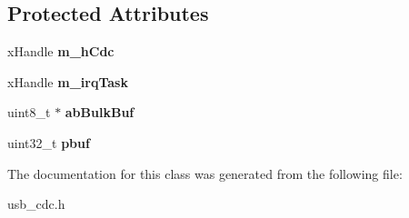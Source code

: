 \subsection*{Protected Attributes}
\begin{DoxyCompactItemize}
\item 
\hypertarget{classusb_c_d_c_a3e75d771150245f193312bd7bc8e6c6c}{x\-Handle {\bfseries m\-\_\-h\-Cdc}}\label{classusb_c_d_c_a3e75d771150245f193312bd7bc8e6c6c}

\item 
\hypertarget{classusb_c_d_c_a9dd6cfe134ba6032c33b1f37b5260c73}{x\-Handle {\bfseries m\-\_\-irq\-Task}}\label{classusb_c_d_c_a9dd6cfe134ba6032c33b1f37b5260c73}

\item 
\hypertarget{classusb_c_d_c_a6e7ef41e22502fc36c48311c8654bc37}{uint8\-\_\-t $\ast$ {\bfseries ab\-Bulk\-Buf}}\label{classusb_c_d_c_a6e7ef41e22502fc36c48311c8654bc37}

\item 
\hypertarget{classusb_c_d_c_a4a1f881b570687525bb133ef2edfd8ae}{uint32\-\_\-t {\bfseries pbuf}}\label{classusb_c_d_c_a4a1f881b570687525bb133ef2edfd8ae}

\end{DoxyCompactItemize}


The documentation for this class was generated from the following file\-:\begin{DoxyCompactItemize}
\item 
usb\-\_\-cdc.\-h\end{DoxyCompactItemize}
